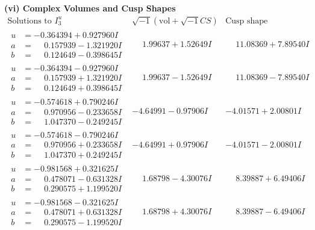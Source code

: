 \documentclass[1p]{elsarticle_modified}
\theoremstyle{definition}
\newcommand{\I}{\sqrt{-1}}
\begin{document}
\newpage\flushleft \textbf{(vi) Complex Volumes and Cusp Shapes}
$$\begin{array}{c|c|c}  
\text{Solutions to }I^u_{3}& \I (\text{vol} + \sqrt{-1}CS) & \text{Cusp shape}\\
 \hline 
\begin{aligned}
u &= -0.364394 + 0.927960 I \\
a &= \phantom{-}0.157939 - 1.321920 I \\
b &= \phantom{-}0.124649 - 0.398645 I\end{aligned}
 & \phantom{-}1.99637 + 1.52649 I & \phantom{-}11.08369 + 7.89540 I \\ \hline\begin{aligned}
u &= -0.364394 - 0.927960 I \\
a &= \phantom{-}0.157939 + 1.321920 I \\
b &= \phantom{-}0.124649 + 0.398645 I\end{aligned}
 & \phantom{-}1.99637 - 1.52649 I & \phantom{-}11.08369 - 7.89540 I \\ \hline\begin{aligned}
u &= -0.574618 + 0.790246 I \\
a &= \phantom{-}0.970956 - 0.233658 I \\
b &= \phantom{-}1.047370 - 0.249245 I\end{aligned}
 & -4.64991 - 0.97906 I & -4.01571 + 2.00801 I \\ \hline\begin{aligned}
u &= -0.574618 - 0.790246 I \\
a &= \phantom{-}0.970956 + 0.233658 I \\
b &= \phantom{-}1.047370 + 0.249245 I\end{aligned}
 & -4.64991 + 0.97906 I & -4.01571 - 2.00801 I \\ \hline\begin{aligned}
u &= -0.981568 + 0.321625 I \\
a &= \phantom{-}0.478071 - 0.631328 I \\
b &= \phantom{-}0.290575 + 1.199520 I\end{aligned}
 & \phantom{-}1.68798 - 4.30076 I & \phantom{-}8.39887 + 6.49406 I \\ \hline\begin{aligned}
u &= -0.981568 - 0.321625 I \\
a &= \phantom{-}0.478071 + 0.631328 I \\
b &= \phantom{-}0.290575 - 1.199520 I\end{aligned}
 & \phantom{-}1.68798 + 4.30076 I & \phantom{-}8.39887 - 6.49406 I \\ \hline\begin{aligned}

\end{aligned}
\end{array}$$
\end{document}
